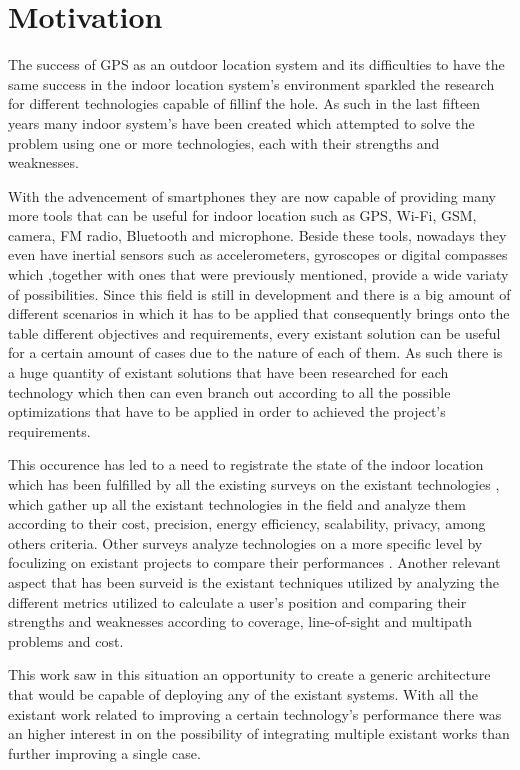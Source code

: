 \section{Motivation}
\label{sec:int_motivation}

The success of \ac{GPS} as an outdoor location system and its difficulties to have the same success in the indoor location system's environment sparkled the research for different technologies capable of fillinf the hole. As such in the last fifteen years many indoor system's have been created which attempted to solve the problem using one or more technologies, each with their strengths and weaknesses. 

With the advencement of smartphones they are now capable of providing many more tools that can be useful for indoor location such as GPS, Wi-Fi, GSM, camera, FM radio, Bluetooth and microphone. Beside these tools, nowadays they even have inertial sensors such as accelerometers, gyroscopes or digital compasses which ,together with ones that were previously mentioned, provide a wide variaty of possibilities. Since this field is still in development and there is a big amount of different scenarios in which it has to be applied that consequently brings onto the table different objectives and requirements, every existant solution can be useful for a certain amount of cases due to the nature of each of them. As such there is a huge quantity of existant solutions that have been researched for each technology which then can even branch out according to all the possible optimizations that have to be applied in order to achieved the project's requirements.

This occurence has led to a need to registrate the state of the indoor location which has been fulfilled by all the existing surveys on the existant technologies \cite{survey1, surveythesis}, which gather up all the existant technologies in the field and analyze them according to their cost, precision, energy efficiency, scalability, privacy, among others criteria. Other surveys analyze technologies on a more specific level by foculizing on existant projects to compare their performances \cite{surveywireless}. Another relevant aspect that has been surveid is the existant techniques utilized \cite{reviewtechniques, survey2} by analyzing the different metrics utilized to calculate a user's position and comparing their strengths and weaknesses according to coverage, line-of-sight and multipath problems and cost.  

This work saw in this situation an opportunity to create a generic architecture that would be capable of deploying any of the existant systems. With all the existant work related to improving a certain technology's performance there was an higher interest in on the possibility of integrating multiple existant works than further improving a single case.



